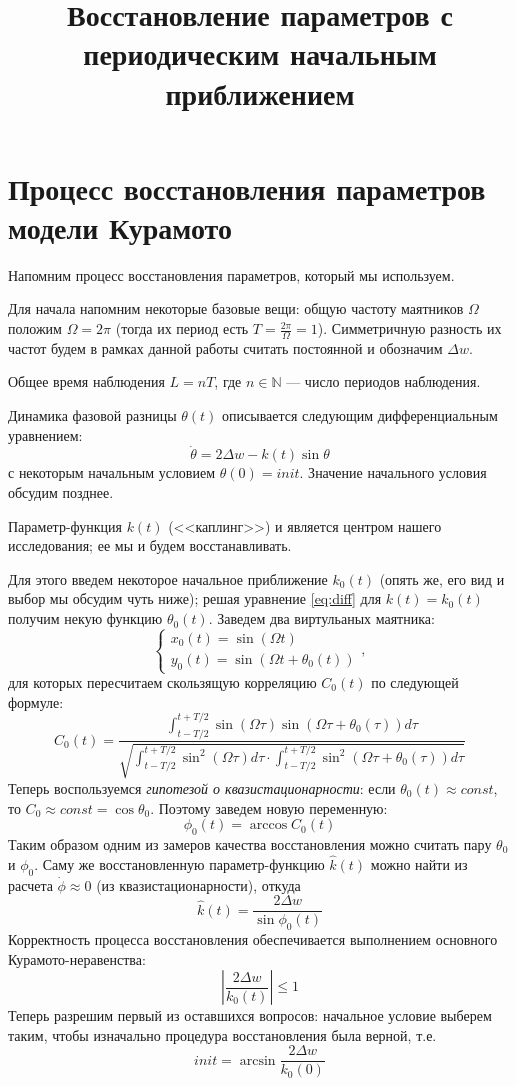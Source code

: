 \documentclass[12pt]{article}
\begin{document}
\title{Восстановление параметров с периодическим начальным приближением}
\maketitle

\section{Процесс восстановления параметров модели Курамото}

Напомним процесс восстановления параметров, который мы используем.

Для начала напомним некоторые базовые вещи: общую частоту маятников $ \Omega $ положим $\Omega = 2\pi$ (тогда их период есть $ T =\frac {2\pi} \Omega = 1$). Симметричную разность их частот будем в рамках данной работы считать постоянной и обозначим $ \Delta w$. 

Общее время наблюдения $L=nT$, где $n \in \mathbb{N}$ --- число периодов наблюдения.

Динамика фазовой разницы $ \theta(t)$ описывается следующим дифференциальным уравнением:
\begin{equation}
\dot{\theta}=2\Delta w - k(t)\sin\theta \label{eq:diff}
\end{equation}
с некоторым начальным условием $\theta(0)=init$. Значение начального условия обсудим позднее.

Параметр-функция $k(t)$ (<<каплинг>>) и является центром нашего исследования; ее мы и будем восстанавливать. 

Для этого введем некоторое начальное приближение $k_0(t)$ (опять же, его вид и выбор мы обсудим чуть ниже); решая уравнение \eqref{eq:diff} для $k(t)=k_0(t)$ получим некую функцию $\theta_0(t)$. Заведем два виртульаных маятника:
\[
\begin{cases}
x_{0}(t)=\sin(\Omega t)\\
y_{0}(t)=\sin(\Omega t+\theta_0(t))
\end{cases},
\]
для которых пересчитаем скользящую корреляцию $C_0(t)$ по следующей формуле:
\[
C_{0}(t)=\frac{\int_{t-T/2}^{t+T/2}\sin(\Omega\tau)\sin(\Omega\tau+\theta_{0}(\tau))d\tau}{\sqrt{\int_{t-T/2}^{t+T/2}\sin^{2}(\Omega\tau)d\tau\cdot\int_{t-T/2}^{t+T/2}\sin^{2}(\Omega\tau+\theta_{0}(\tau))d\tau}}
\]
Теперь воспользуемся \textit{гипотезой о квазистационарности}: если \( \theta_0(t) \approx const \), то $C_0 \approx const = \cos \theta_0 $. Поэтому заведем новую переменную:
\[
\phi_0(t)=\arccos C_0(t)
\]
Таким образом одним из замеров качества восстановления можно считать пару \( \theta_0 \) и \(\phi_0 \). Саму же восстановленную параметр-функцию \( \hat{k}(t) \) можно найти из расчета $ \dot{\phi} \approx 0$ (из квазистационарности), откуда
\[
\hat{k}(t)=\frac{2\Delta w}{\sin \phi_0(t)}
\]
Корректность процесса восстановления обеспечивается выполнением основного Курамото-неравенства:
\begin{equation}
\left|\frac{2\Delta w}{k_{0}(t)}\right|\le 1\label{eq:main}
\end{equation}
Теперь разрешим первый из оставшихся вопросов: начальное условие выберем таким, чтобы изначально процедура восстановления была верной, т.е.
\[
init=\arcsin\frac{2\Delta w}{k_0(0)}
\]
\end{document}
